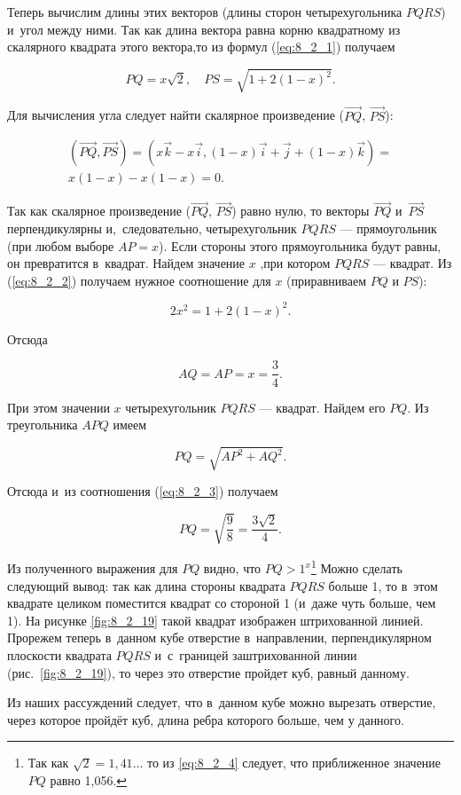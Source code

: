 Теперь вычислим длины этих векторов (длины сторон четырехугольника $PQRS$)
и~угол между ними. Так как длина вектора равна корню квадратному из скалярного
квадрата этого вектора,то из формул (\ref{eq:8_2_1}) получаем

\begin{equation}\label{eq:8_2_2}
PQ = x\sqrt{2}, \quad PS = \sqrt{1 + 2(1 - x)^{2}}.
\end{equation}

Для вычисления угла следует найти скалярное произведение
($\overrightarrow{PQ}$, $\overrightarrow{PS}$):

\begin{multline*}
(\overrightarrow{PQ}, \overrightarrow{PS}) =
(x\vec{k} - x\vec{i}, (1 - x)\vec{i} + \vec{j} + (1 - x)\vec{k}) = \\
x(1 - x) - x(1 - x) = 0.
\end{multline*}

Так как скалярное произведение ($\overrightarrow{PQ}$, $\overrightarrow{PS}$)
равно нулю, то векторы $\overrightarrow{PQ}$ и~$\overrightarrow{PS}$
перпендикулярны и,~следовательно, четырехугольник $PQRS$ --- прямоугольник
(при любом выборе $AP = x$). Если стороны этого прямоугольника будут равны,
он превратится в~квадрат. Найдем значение $x$ ‚при котором $PQRS$ --- квадрат.
Из (\ref{eq:8_2_2}) получаем нужное соотношение для $x$ (приравниваем $PQ$
и $PS$):

\begin{equation*}
2x^{2} = 1 + 2(1 - x)^{2}.
\end{equation*}

Отсюда

\begin{equation}\label{eq:8_2_3}
AQ = AP = x = \dfrac{3}{4}.
\end{equation}

При этом значении $x$ четырехугольник $PQRS$ --- квадрат.
Найдем его $PQ$. Из треугольника $APQ$ имеем

\begin{equation*}
PQ = \sqrt{AP^{2} + AQ^{2}}.
\end{equation*}

Отсюда и~из соотношения (\ref{eq:8_2_3}) получаем

\begin{equation}\label{eq:8_2_4}
PQ = \sqrt{\dfrac{9}{8}} = \dfrac{3\sqrt{2}}{4}.
\end{equation}

Из полученного выражения для $PQ$ видно, что $PQ > 1^{x}$\footnote{
Так как $\sqrt{2} = 1,41\dots$  то из \ref{eq:8_2_4} следует, что приближенное
значение $PQ$ равно 1,056.}
Можно сделать следующий вывод: так как длина стороны квадрата $PQRS$ больше 1,
то в~этом квадрате целиком поместится квадрат со стороной 1 (и~даже чуть больше,
чем 1). На рисунке \ref{fig:8_2_19} такой квадрат изображен штрихованной линией.
Прорежем теперь в~данном кубе отверстие в~направлении, перпендикулярном плоскости
квадрата $PQRS$ и~с~границей заштрихованной линии (рис.\ \ref{fig:8_2_19}),
то через это отверстие пройдет куб, равный данному.

\begin{Note}
Из наших рассуждений следует, что в~данном кубе можно вырезать отверстие, через
которое пройдёт куб, длина ребра которого больше, чем у данного.
\end{Note}
